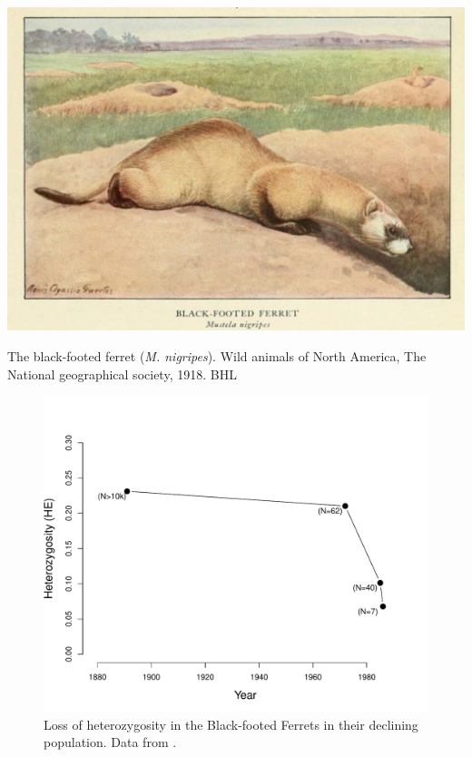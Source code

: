 \begin{marginfigure}[6cm]
\begin{center}
\includegraphics[width=\textwidth]{illustration_images/Genetic_drift/Black_footed_ferrets/Black_footed_ferret.pdf}
\end{center}
\caption{The black-footed ferret ({\it M. nigripes}). Wild animals of North America, The National geographical
  society, 1918. BHL} \label{fig:black_footed_ferret}  
\end{marginfigure} 

\begin{figure}
\begin{center}
\includegraphics[width= \textwidth]{Journal_figs/genetic_drift/black_footed_ferrets/black_footed_ferrets_He.pdf}
\end{center}
\caption{Loss of heterozygosity in the Black-footed Ferrets in their declining population. Data from \citet{Wisely:02}.} \label{fig:LossHet_ferrets}  
\end{figure} 

